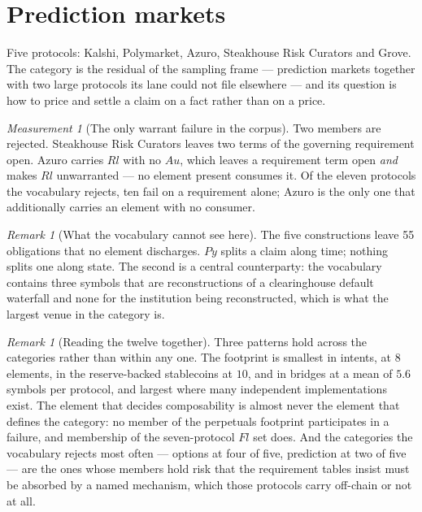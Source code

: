\documentclass[11pt,reqno]{amsart}
\theoremstyle{plain}
\theoremstyle{definition}
\theoremstyle{remark}
\newtheorem{measurement}[theorem]{Measurement}
\newtheorem{remark}[theorem]{Remark}
\begin{document}
\section{Prediction markets}\label{sec:cat:pred}

Five protocols: Kalshi, Polymarket, Azuro, Steakhouse Risk Curators and Grove.
The category is the residual of the sampling frame --- prediction markets
together with two large protocols its lane could not file elsewhere --- and its
question is how to price and settle a claim on a fact rather than on a price.

\begin{measurement}[The only warrant failure in the corpus]\label{meas:cat:predrej}
Two members are rejected. Steakhouse Risk Curators leaves two terms of the
governing requirement open. Azuro carries $Rl$ with no $Au$, which leaves a
requirement term open \emph{and} makes $Rl$ unwarranted --- no element present
consumes it. Of the eleven protocols the vocabulary rejects, ten fail on a
requirement alone; Azuro is the only one that additionally carries an element
with no consumer.
\end{measurement}

\begin{remark}[What the vocabulary cannot see here]
The five constructions leave 55 obligations that no element discharges. $Py$ splits a claim along time; nothing
splits one along state. The second is a central counterparty: the vocabulary
contains three symbols that are reconstructions of a clearinghouse default
waterfall and none for the institution being reconstructed, which is what the
largest venue in the category is.
\end{remark}

\begin{remark}[Reading the twelve together]
Three patterns hold across the categories rather than within any one. The footprint is smallest in intents, at $8$ elements, in the reserve-backed
stablecoins at $10$, and in bridges at a mean of $5.6$ symbols per protocol, and
largest where many independent implementations exist. The
element that decides composability is almost never the element that defines the
category: no member of the perpetuals footprint participates in a failure, and
membership of the seven-protocol $Fl$ set does. And the categories the
vocabulary rejects most often --- options at four of five, prediction at two of
five --- are the ones whose members hold risk that the requirement tables
insist must be absorbed by a named mechanism, which those protocols carry
off-chain or not at all.
\end{remark}
\end{document}
